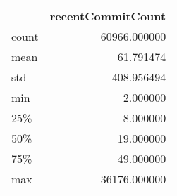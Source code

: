 \begin{tabular}{lr}
 & \textbf{recentCommitCount} \\
count & 60966.000000 \\
mean & 61.791474 \\
std & 408.956494 \\
min & 2.000000 \\
25\% & 8.000000 \\
50\% & 19.000000 \\
75\% & 49.000000 \\
max & 36176.000000 \\
\end{tabular}

